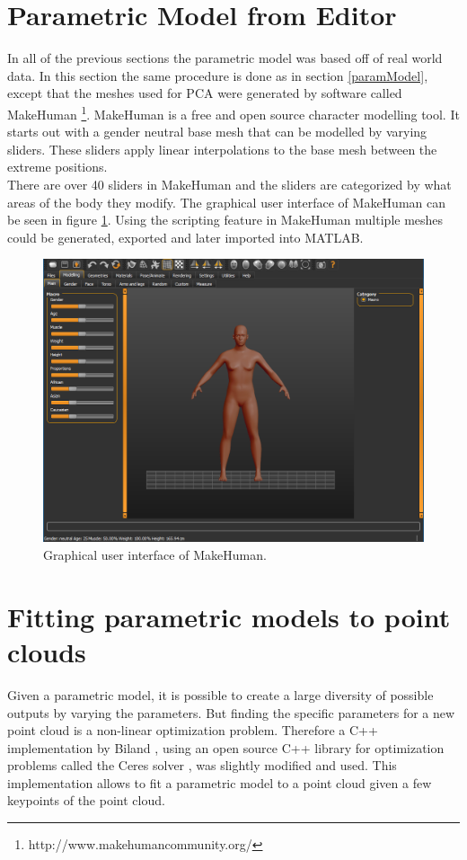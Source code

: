 \section{Parametric Model from Editor}
In all of the previous sections the parametric model was based off of real world data. In this section the same procedure is done as in section \ref{paramModel}, except that the meshes used for PCA were generated by software called MakeHuman \footnote{http://www.makehumancommunity.org/}. MakeHuman is a free and open source character modelling tool. It starts out with a gender neutral base mesh that can be modelled by varying sliders. These sliders apply linear interpolations to the base mesh between the extreme positions.\\
There are over 40 sliders in MakeHuman and the sliders are categorized by what areas of the body they modify. The graphical user interface of MakeHuman can be seen in figure \ref{fig:mhgui}. Using the scripting feature in MakeHuman multiple meshes could be generated, exported and later imported into MATLAB.

\begin{figure}[h]
\centering
\includegraphics[width=1\textwidth]{figures/mhgui}
\caption{Graphical user interface of MakeHuman.}
\label{fig:mhgui}
\end{figure}

\section{Fitting parametric models to point clouds}
\label{fitModel}
Given a parametric model, it is possible to create a large diversity of possible outputs by varying the parameters. But finding the specific parameters for a new point cloud is a non-linear optimization problem. Therefore a C++ implementation by Biland \cite{Biland17}, using an open source C++ library for optimization problems called the Ceres solver \cite{ceres-solver}, was slightly modified and used. This implementation allows to fit a parametric model to a point cloud given a few keypoints of the point cloud.\\

